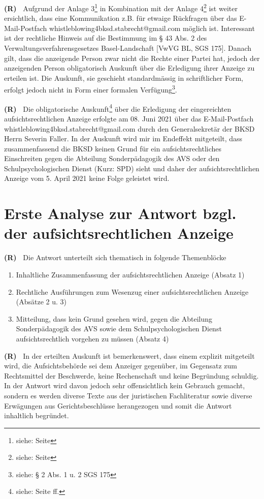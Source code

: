 \documentclass[paper=a4,fontsize=12pt, oneside, numbers=noenddot]{scrbook}
\newcounter{rz}
\newcommand{\Rz}{
	\addtocounter{rz}{1}\textbf{(R\arabic{rz})~}
}
\begin{document}
\Rz Aufgrund der Anlage 3\footnote{siehe:  Seite \pageref{NachfrageAnzeige}} in Kombination mit der Anlage 4\footnote{siehe:  Seite \pageref{AntwortNachfrageAnzeige}} ist weiter ersichtlich, dass eine Kommunikation z.B. für etwaige Rückfragen über das E-Mail-Postfach whistleblowing4bksd.stabrecht@gmail.com möglich ist. Interessant ist der rechtliche Hinweis auf die Bestimmung im § 43 Abs. 2 des Verwaltungsverfahrensgesetzes Basel-Landschaft [VwVG BL, SGS 175]. Danach gilt, dass die anzeigende Person zwar nicht die Rechte einer Partei hat, jedoch der anzeigenden Person obligatorisch Auskunft über die Erledigung ihrer Anzeige zu erteilen ist. Die Auskunft, sie geschieht  standardmässig in schriftlicher Form, erfolgt jedoch nicht in Form einer formalen Verfügung\footnote{siehe: § 2 Abs. 1 u. 2 SGS 175}.

\Rz Die obligatorische Auskunft\footnote{siehe: Seite \pageref{EntscheidAnzeige} ff.} über die Erledigung der eingereichten aufsichtsrechtlichen Anzeige erfolgte am 08. Juni 2021 über das E-Mail-Postfach whistleblowing4bksd.stabrecht@gmail.com durch den Generalsekretär der BKSD Herrn Severin Faller. In der Auskunft wird mir im Endeffekt mitgeteilt, dass zusammenfassend die BKSD keinen Grund für ein aufsichtsrechtliches Einschreiten gegen die Abteilung Sonderpädagogik des AVS oder den Schulpsychologischen Dienst (Kurz: SPD) sieht und daher der aufsichtsrechtlichen Anzeige vom 5. April 2021 keine Folge geleistet wird.

\section{Erste Analyse zur Antwort bzgl. der aufsichtsrechtlichen Anzeige}
\Rz Die Antwort unterteilt sich thematisch in folgende Themenblöcke
\begin{enumerate}[noitemsep]\setlength\itemsep{0.3em}
	\item Inhaltliche Zusammenfassung der aufsichtsrechtlichen Anzeige (Absatz 1)
	\item Rechtliche Ausführungen zum Wesenzug einer aufsichtsrechtlichen Anzeige (Absätze 2 u. 3)
	\item Mitteilung, dass kein Grund gesehen wird, gegen die Abteilung Sonderpädagogik des AVS sowie dem Schulpsychologischen Dienst aufsichtsrechtlich vorgehen zu müssen (Absatz 4)
	
\end{enumerate} 



\Rz In der erteilten Auskunft ist bemerkenswert, dass einem  explizit mitgeteilt wird, die Aufsichtsbehörde sei dem Anzeiger gegenüber, im Gegensatz zum Rechtsmittel der Beschwerde, keine Rechenschaft und keine Begründung schuldig. In der Antwort wird davon jedoch sehr offensichtlich kein Gebrauch gemacht, sondern es werden diverse Texte aus der juristischen Fachliteratur sowie diverse Erwägungen aus Gerichtsbeschlüsse herangezogen und somit die Antwort inhaltlich begründet. 
\end{document}
